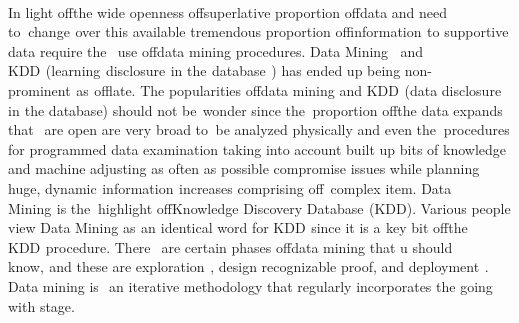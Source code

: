 \documentclass[oneside,12pt]{Classes/VTU}
\begin{document}
    \paragraph{}
    In light of\tiny\textcolor{white}{f}\normalsize the wide openness of\tiny\textcolor{white}{f}\normalsize superlative proportion of\tiny\textcolor{white}{f}\normalsize data and need to\tiny\textcolor{white}{o}\normalsize change\tiny\textcolor{white}{s}\normalsize over this available tremendous proportion of\tiny\textcolor{white}{f}\normalsize information\tiny\textcolor{white}{s}\normalsize to supportive data require the\tiny\textcolor{white}{m}\normalsize use of\tiny\textcolor{white}{f}\normalsize data mining procedures. Data Mining \tiny\textcolor{white}{b}\normalsize and KDD\tiny\textcolor{white}{s}\normalsize (learning\tiny\textcolor{white}{s}\normalsize disclosure\tiny\textcolor{white}{s}\normalsize in the\tiny\textcolor{white}{s}\normalsize database\tiny\textcolor{white}{s}\normalsize) has ended up being non-prominent\tiny\textcolor{white}{s}\normalsize as\tiny\textcolor{white}{s}\normalsize of\tiny\textcolor{white}{f}\normalsize late. The popularities of\tiny\textcolor{white}{f}\normalsize data mining and KDD\tiny\textcolor{white}{s}\normalsize (data disclosure in\tiny\textcolor{white}{t}\normalsize the database) should not be\tiny\textcolor{white}{e}\normalsize wonder since the\tiny\textcolor{white}{y}\normalsize proportion of\tiny\textcolor{white}{f}\normalsize the data expands that \tiny\textcolor{white}{c}\normalsize are open are very broad to\tiny\textcolor{white}{o}\normalsize be analyzed physically and even the\tiny\textcolor{white}{n}\normalsize procedures for programmed data examination taking into account built up bits of knowledge and machine adjusting as often as possible compromise issues while planning huge, dynamic\tiny\textcolor{white}{s}\normalsize information\tiny\textcolor{white}{s}\normalsize increases comprising of\tiny\textcolor{white}{f}\normalsize \tiny\textcolor{white}{a}\normalsize complex item. Data Mining\tiny\textcolor{white}{s}\normalsize is the\tiny\textcolor{white}{n}\normalsize highlight of\tiny\textcolor{white}{f}\normalsize Knowledge Discovery Database\tiny\textcolor{white}{s}\normalsize (KDD). Various people view Data Mining as\tiny\textcolor{white}{s}\normalsize an\tiny\textcolor{white}{t}\normalsize identical word for KDD\tiny\textcolor{white}{s}\normalsize since it is a\tiny\textcolor{white}{s}\normalsize key bit of\tiny\textcolor{white}{f}\normalsize the KDD\tiny\textcolor{white}{s}\normalsize procedure. There \tiny\textcolor{white}{c}\normalsize are certain phases of\tiny\textcolor{white}{f}\normalsize data mining that u should know,\tiny\textcolor{white}{s}\normalsize and these are exploration\tiny\textcolor{white}{s}\normalsize, design recognizable proof, and deployment\tiny\textcolor{white}{s}\normalsize. Data mining is \tiny\textcolor{white}{r}\normalsize an iterative methodology that regularly incorporates the going with stage.
\end{document}
